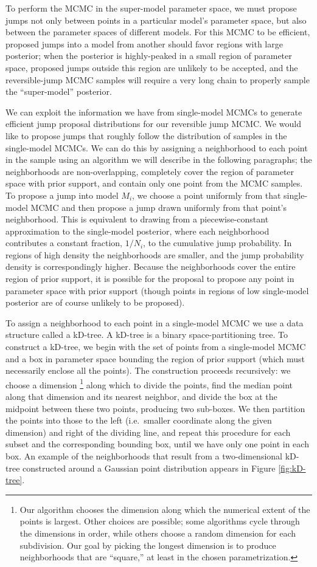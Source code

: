 \documentclass[preprint]{aastex}
\begin{document}
To perform the MCMC in the super-model parameter space, we must
propose jumps not only between points in a particular model's
parameter space, but also between the parameter spaces of different
models.  For this MCMC to be efficient, proposed jumps into a model
from another should favor regions with large posterior; when the
posterior is highly-peaked in a small region of parameter space,
proposed jumps outside this region are unlikely to be accepted, and
the reversible-jump MCMC samples will require a very long chain to
properly sample the ``super-model'' posterior.

We can exploit the information we have from single-model MCMCs to
generate efficient jump proposal distributions for our reversible jump
MCMC.  We would like to propose jumps that roughly follow the
distribution of samples in the single-model MCMCs.  We can do this by
assigning a neighborhood to each point in the sample using an
algorithm we will describe in the following paragraphs; the
neighborhoods are non-overlapping, completely cover the region of
parameter space with prior support, and contain only one point from
the MCMC samples.  To propose a jump into model $M_i$, we choose a
point uniformly from that single-model MCMC and then propose a jump
drawn uniformly from that point's neighborhood.  This is equivalent to
drawing from a piecewise-constant approximation to the single-model
posterior, where each neighborhood contributes a constant fraction,
$1/N_i$, to the cumulative jump probability.  In regions of high
density the neighborhoods are smaller, and the jump probability
density is correspondingly higher.  Because the neighborhoods cover
the entire region of prior support, it is possible for the proposal to
propose any point in parameter space with prior support (though points
in regions of low single-model posterior are of course unlikely to be
proposed).

To assign a neighborhood to each point in a single-model MCMC we use a
data structure called a kD-tree.  A kD-tree is a binary
space-partitioning tree.  To construct a kD-tree, we begin with the
set of points from a single-model MCMC and a box in parameter space
bounding the region of prior support (which must necessarily enclose
all the points).  The construction proceeds recursively: we choose a
dimension%
\footnote{Our algorithm chooses the dimension along which the
  numerical extent of the points is largest.  Other choices are
  possible; some algorithms cycle through the dimensions in order,
  while others choose a random dimension for each subdivision.  Our
  goal by picking the longest dimension is to produce neighborhoods
  that are ``square,'' at least in the chosen parametrization.} %
along which to divide the points, find the median point along that
dimension and its nearest neighbor, and divide the box at the midpoint
between these two points, producing two sub-boxes.  We then partition
the points into those to the left (i.e.\ smaller coordinate along the
given dimension) and right of the dividing line, and repeat this
procedure for each subset and the corresponding bounding box, until we
have only one point in each box.  An example of the neighborhoods that
result from a two-dimensional kD-tree constructed around a Gaussian
point distribution appears in Figure \ref{fig:kD-tree}.
\end{document}
